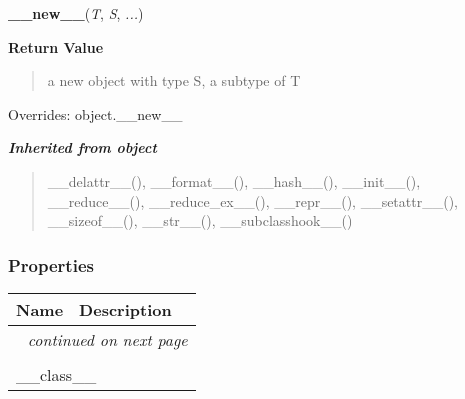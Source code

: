     \vspace{0.5ex}

\hspace{.8\funcindent}\begin{boxedminipage}{\funcwidth}

    \raggedright \textbf{\_\_new\_\_}(\textit{T}, \textit{S}, \textit{...})

\setlength{\parskip}{2ex}
\setlength{\parskip}{1ex}
      \textbf{Return Value}
    \vspace{-1ex}

      \begin{quote}
      a new object with type S, a subtype of T

      \end{quote}

      Overrides: object.\_\_new\_\_

    \end{boxedminipage}


\large{\textbf{\textit{Inherited from object}}}

\begin{quote}
\_\_delattr\_\_(), \_\_format\_\_(), \_\_hash\_\_(), \_\_init\_\_(), \_\_reduce\_\_(), \_\_reduce\_ex\_\_(), \_\_repr\_\_(), \_\_setattr\_\_(), \_\_sizeof\_\_(), \_\_str\_\_(), \_\_subclasshook\_\_()
\end{quote}


  \subsubsection{Properties}

    \vspace{-1cm}
\hspace{\varindent}\begin{longtable}{|p{\varnamewidth}|p{\vardescrwidth}|l}
\cline{1-2}
\cline{1-2} \centering \textbf{Name} & \centering \textbf{Description}& \\
\cline{1-2}
\endhead\cline{1-2}\multicolumn{3}{r}{\small\textit{continued on next page}}\\\endfoot\cline{1-2}
\endlastfoot\multicolumn{2}{|l|}{\textit{Inherited from object}}\\
\multicolumn{2}{|p{\varwidth}|}{\raggedright \_\_class\_\_}\\
\cline{1-2}
\end{longtable}

